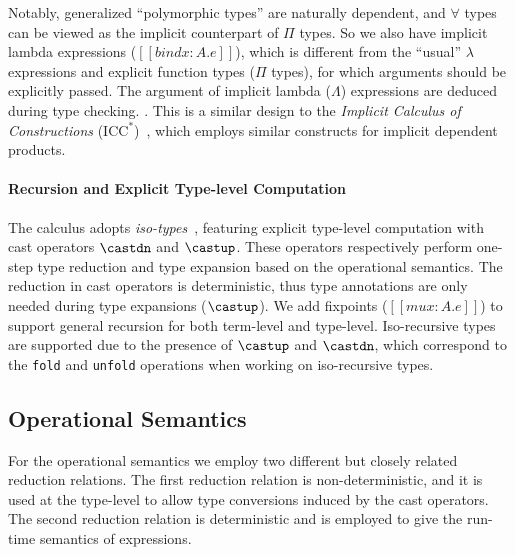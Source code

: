 Notably,
generalized ``polymorphic types'' are naturally dependent, and $\forall$
types can be viewed as the implicit counterpart of $\Pi$ types.
So we also have implicit lambda expressions ($[[bind x : A. e]]$),
which is different from the ``usual'' $\lambda$ expressions and explicit function
types ($\Pi$ types), for which arguments should be explicitly passed. The argument
of implicit lambda ($\Lambda$) expressions are deduced during type checking.
.
This is a similar design to
the \emph{Implicit Calculus of Constructions} ($\text{ICC}^*$)~\cite{barras2008implicit}, which
employs similar constructs for implicit dependent products.


\paragraph{Recursion and Explicit Type-level Computation}
\label{sec:cast}
The \name calculus adopts \emph{iso-types}~\cite{isotype,yang2019pure},
featuring explicit type-level computation with cast operators
$\castdn$ and $\castup$. These operators respectively perform one-step
type reduction and type expansion based on the operational semantics.
The reduction in cast operators is deterministic, thus type
annotations are only needed during type expansions ($\castup$). We add
fixpoints ($[[mu x : A. e]]$) to support general recursion for both
term-level and type-level. Iso-recursive types are supported due to
the presence of $\castup$ and $\castdn$, which correspond to the
\verb|fold| and \verb|unfold| operations when working on iso-recursive types.

\subsection{Operational Semantics}\label{subsec:semantics}

For the operational semantics we employ two different but closely related
reduction relations. The first reduction relation is non-deterministic, and
it is used at the type-level to allow type conversions induced
by the cast operators. The second reduction relation is deterministic and
is employed to give the run-time semantics of expressions.

